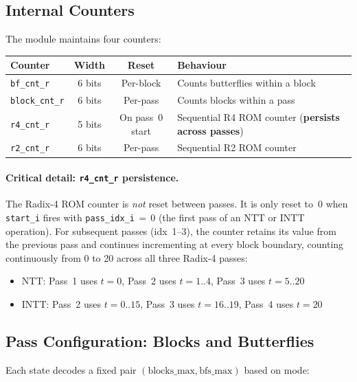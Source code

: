 \documentclass[11pt,a4paper]{article}
\newcommand{\sv}[1]{\texttt{#1}}
\newcommand{\port}[1]{\texttt{#1}}
\begin{document}
\subsection{Internal Counters}

The module maintains four counters:

\begin{center}
\renewcommand{\arraystretch}{1.3}
\begin{tabular}{lccl}
  \toprule
  \textbf{Counter} & \textbf{Width} & \textbf{Reset} & \textbf{Behaviour} \\
  \midrule
  \sv{bf\_cnt\_r}    & 6 bits & Per-block  & Counts butterflies within a block \\
  \sv{block\_cnt\_r} & 6 bits & Per-pass   & Counts blocks within a pass \\
  \sv{r4\_cnt\_r}    & 5 bits & On pass~0 start & Sequential R4 ROM counter (\textbf{persists across passes}) \\
  \sv{r2\_cnt\_r}    & 6 bits & Per-pass   & Sequential R2 ROM counter \\
  \bottomrule
\end{tabular}
\end{center}

\paragraph{Critical detail: \sv{r4\_cnt\_r} persistence.}
The Radix-4 ROM counter is \emph{not} reset between passes. It is only reset to~0
when \port{start\_i} fires with \port{pass\_idx\_i}$\,=\,$0 (the first pass of an
NTT or INTT operation). For subsequent passes (idx~1--3), the counter retains
its value from the previous pass and continues incrementing at every block
boundary, counting continuously from 0 to 20 across all three Radix-4 passes:
\begin{itemize}
  \item NTT: Pass~1 uses $t=0$, Pass~2 uses $t=1..4$, Pass~3 uses $t=5..20$
  \item INTT: Pass~2 uses $t=0..15$, Pass~3 uses $t=16..19$, Pass~4 uses $t=20$
\end{itemize}

\subsection{Pass Configuration: Blocks and Butterflies}

Each state decodes a fixed pair $(\text{blocks\_max}, \text{bfs\_max})$ based on mode:
\end{document}
